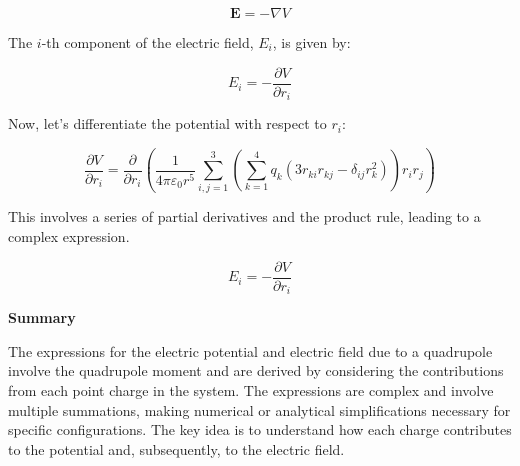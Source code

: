 \documentclass[a4paper, 12pt]{article}
\begin{document}
\[ \mathbf{E} = -\nabla V \]

The \(i\)-th component of the electric field, \(E_i\), is given by:

\[ E_i = -\frac{\partial V}{\partial r_i} \]

Now, let's differentiate the potential with respect to \(r_i\):

\[ \frac{\partial V}{\partial r_i} = \frac{\partial}{\partial r_i} \left(\frac{1}{4\pi\varepsilon_0 r^5} \sum_{i,j=1}^3 \left(\sum_{k=1}^4 q_k \left(3r_{ki} r_{kj} - \delta_{ij} r_k^2\right)\right) r_i r_j\right) \]

This involves a series of partial derivatives and the product rule, leading to a complex expression.

\[ E_i = -\frac{\partial V}{\partial r_i} \]

{\bf Summary}

The expressions for the electric potential and electric field due to a quadrupole involve the quadrupole moment and are derived by considering the contributions from each point charge in the system. The expressions are complex and involve multiple summations, making numerical or analytical simplifications necessary for specific configurations. The key idea is to understand how each charge contributes to the potential and, subsequently, to the electric field.
%
%
\end{document}

